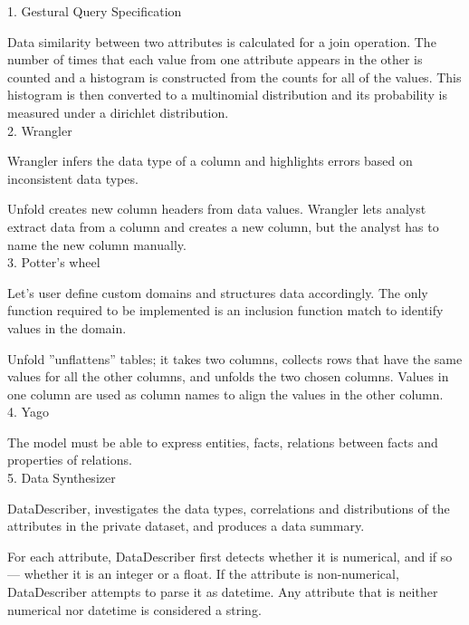 1. Gestural Query Specification

Data similarity between two attributes is calculated for a join operation. The number of times that each value from one attribute appears in the other is counted and a histogram is constructed from the counts for all of the values. This histogram is then converted to a multinomial distribution and its probability is measured under a dirichlet distribution.\\

2. Wrangler

Wrangler infers the data type of a column and highlights errors based on inconsistent data types.

Unfold creates new column headers from data values. Wrangler lets analyst extract data from a column and creates a new column, but the analyst has to name the new column manually.\\

3. Potter's wheel

Let's user define custom domains and structures data accordingly. The only function required to be implemented is an inclusion function match to identify values in the domain.

Unfold ”unflattens” tables; it takes two columns, collects rows that have the same values for all the other columns, and unfolds the two chosen columns. Values in one column are used as column names to align the values in the other column.\\

4. Yago

The model must be able to express entities, facts, relations
between facts and properties of relations.\\

5. Data Synthesizer

DataDescriber,
investigates the data types, correlations and distributions of the attributes
in the private dataset, and produces a data summary.

For each attribute, DataDescriber first detects whether it is numerical, and if so — whether it is an integer or a float. If the attribute is non-numerical, DataDescriber attempts to parse it as datetime. Any attribute that is neither numerical nor datetime is considered a string.